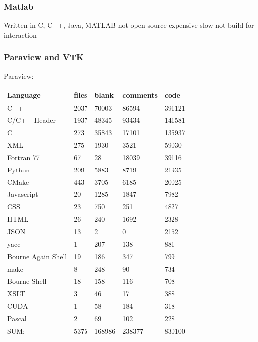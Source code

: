 \subsubsection{Matlab}
Written in C, C++, Java, MATLAB
not open source
expensive
slow
not build for interaction


\subsubsection{Paraview and VTK}
Paraview:
\begin{center}
\begin{tabular}{ l|l|l|l|l }
	\hline
	\textbf{Language}              &\textbf{files} &\textbf{blank} &\textbf{comments} & \textbf{code} \\
	\hline
	C++                            &2037          &70003         &86594         & 391121\\
	C/C++ Header                   &1937          &48345         & 93434        & 141581\\
	C                              & 273          &35843         & 17101        & 135937\\
	XML                            & 275          & 1930         &  3521        &  59030\\
	Fortran 77                     &  67          &   28         & 18039        &  39116\\
	Python                         & 209          & 5883         &  8719        &  21935\\
	CMake                          & 443          & 3705         &  6185        &  20025\\
	Javascript                     &  20          & 1285         &  1847        &   7982\\
	CSS                            &  23          &  750         &   251        &   4827\\
	HTML                           &  26          &  240         &  1692        &   2328\\
	JSON                           &  13          &    2         &     0        &   2162\\
	yacc                           &   1          &  207         &   138        &    881\\
	Bourne Again Shell             &  19          &  186         &   347        &    799\\
	make                           &   8          &  248         &    90        &    734\\
	Bourne Shell                   &  18          &  158         &   116        &    708\\
	XSLT                           &   3          &   46         &    17        &    388\\
	CUDA                           &   1          &   58         &   184        &    318\\
	Pascal                         &   2          &   69         &   102        &    228\\
	\hline
	SUM:                           &5375         &168986         &238377         &830100\\
	\hline
\end{tabular}
\end{center}

